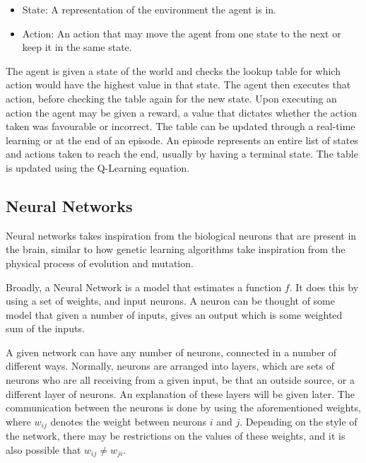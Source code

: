 \begin{itemize}
    \item State: A representation of the environment the agent is in.
    \item Action: An action that may move the agent
        from one state to the next or keep it in the same state.
\end{itemize}

The agent is given a state of the world and checks the lookup table for which
action would have the highest value in that state. The agent then executes that
action, before checking the table again for the new state. Upon executing an action the
agent may be given a reward, a value that dictates whether the action taken was
favourable or incorrect. The table can be updated through a real-time learning
or at the end of an episode. An episode represents an entire list of states and
actions taken to reach the end, usually by having a terminal state. The table
is updated using the Q-Learning equation.


\subsection{Neural Networks}

Neural networks takes inspiration from the biological neurons that
are present in the brain, similar to how genetic learning
algorithms take inspiration from the physical process of evolution
and mutation\cite{goldberg2006genetic}.

Broadly, a Neural Network is a model that estimates a function $f$.
It does this by using a set of weights, and input neurons. A neuron
can be thought of some model that given a number of inputs, gives
an output which is some weighted sum of the inputs.

A given network can have any number of neurons, connected in a number
of different ways. Normally, neurons are arranged into layers, which
are sets of neurons who are all receiving from a given input, be
that an outside source, or a different layer of neurons. An explanation of
these layers will be given later. The communication
between the neurons is done by using the aforementioned weights, where
$w_{ij}$ denotes the weight between neurons $i$ and $j$. Depending on the
style of the network, there may be restrictions on the values of these
weights, and it is also possible that $w_{ij} \ne w_{ji}$.

